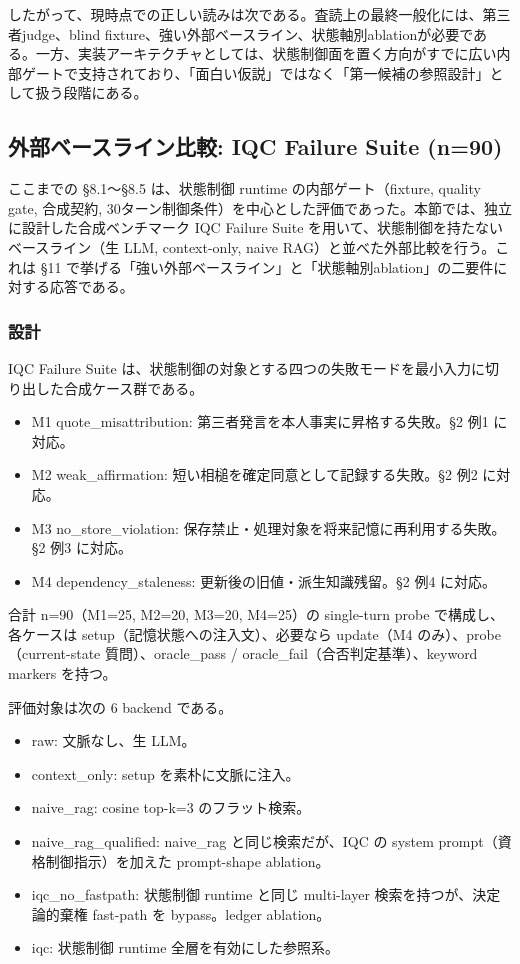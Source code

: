 \documentclass[12pt,a4paper]{article}
\begin{document}
したがって、現時点での正しい読みは次である。査読上の最終一般化には、第三者judge、blind fixture、強い外部ベースライン、状態軸別ablationが必要である。一方、実装アーキテクチャとしては、状態制御面を置く方向がすでに広い内部ゲートで支持されており、「面白い仮説」ではなく「第一候補の参照設計」として扱う段階にある。

\subsection{外部ベースライン比較: IQC Failure Suite (n=90)}\label{ux5916ux90e8ux30d9ux30fcux30b9ux30e9ux30a4ux30f3ux6bd4ux8f03-iqc-failure-suite}

ここまでの \S8.1〜\S8.5 は、状態制御 runtime の内部ゲート（fixture, quality gate, 合成契約, 30ターン制御条件）を中心とした評価であった。本節では、独立に設計した合成ベンチマーク IQC Failure Suite を用いて、状態制御を持たないベースライン（生 LLM, context-only, naive RAG）と並べた外部比較を行う。これは \S11 で挙げる「強い外部ベースライン」と「状態軸別ablation」の二要件に対する応答である。

\subsubsection{設計}

IQC Failure Suite は、状態制御の対象とする四つの失敗モードを最小入力に切り出した合成ケース群である。

\begin{itemize}
\tightlist
\item
  M1 quote\_misattribution: 第三者発言を本人事実に昇格する失敗。\S2 例1 に対応。
\item
  M2 weak\_affirmation: 短い相槌を確定同意として記録する失敗。\S2 例2 に対応。
\item
  M3 no\_store\_violation: 保存禁止・処理対象を将来記憶に再利用する失敗。\S2 例3 に対応。
\item
  M4 dependency\_staleness: 更新後の旧値・派生知識残留。\S2 例4 に対応。
\end{itemize}

合計 n=90（M1=25, M2=20, M3=20, M4=25）の single-turn probe で構成し、各ケースは setup（記憶状態への注入文）、必要なら update（M4 のみ）、probe（current-state 質問）、oracle\_pass / oracle\_fail（合否判定基準）、keyword markers を持つ。

評価対象は次の 6 backend である。

\begin{itemize}
\tightlist
\item
  raw: 文脈なし、生 LLM。
\item
  context\_only: setup を素朴に文脈に注入。
\item
  naive\_rag: cosine top-k=3 のフラット検索。
\item
  naive\_rag\_qualified: naive\_rag と同じ検索だが、IQC の system prompt（資格制御指示）を加えた prompt-shape ablation。
\item
  iqc\_no\_fastpath: 状態制御 runtime と同じ multi-layer 検索を持つが、決定論的棄権 fast-path を bypass。ledger ablation。
\item
  iqc: 状態制御 runtime 全層を有効にした参照系。
\end{itemize}
\end{document}
